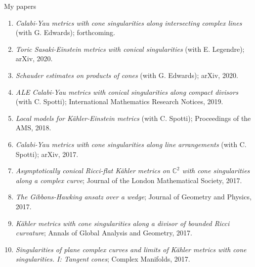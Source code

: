 \documentclass{beamer}
\newcommand{\C}{\mathbb{C}}
\begin{document}
\begin{frame}{My papers}
	\scriptsize{
	\begin{enumerate}
		\item  \emph{Calabi-Yau metrics with cone singularities along intersecting complex lines} (with G. Edwards); forthcoming.
		\item \emph{Toric Sasaki-Einstein metrics with conical singularities} (with E. Legendre); arXiv, 2020.
		\item \emph{Schauder estimates on products of cones} (with G. Edwards); arXiv, 2020.
		\item \emph{ALE Calabi-Yau metrics with conical singularities along compact divisors} (with C. Spotti); International Mathematics Research Notices, 2019.
		\item \emph{Local models for K\"ahler-Einstein metrics} (with C. Spotti); Proceedings of the AMS, 2018.
		\item \emph{Calabi-Yau metrics with cone singularities along line arrangements}  (with C. Spotti); arXiv, 2017.
		\item \emph{Asymptotically conical Ricci-flat K\"ahler metrics on \(\C^2\) with cone singularities along a complex curve}; Journal of the London Mathematical Society, 2017.
		\item \emph{The Gibbons-Hawking ansatz over a wedge}; Journal of Geometry and Physics, 2017.
		\item \emph{K\"ahler metrics with cone singularities along a divisor of bounded Ricci curvature}; Annals of Global Analysis and Geometry, 2017.
		\item \emph{Singularities of plane complex curves and limits of K\"ahler metrics with cone singularities. I: Tangent cones}; Complex Manifolds, 2017.
	\end{enumerate}
}
\end{frame}
\end{document}
